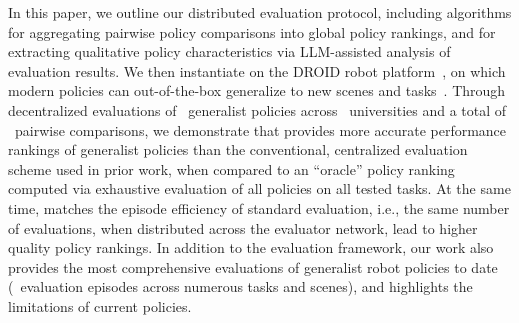 In this paper, we outline our distributed evaluation protocol, including algorithms for aggregating pairwise policy comparisons into global policy rankings, and for extracting qualitative policy characteristics via LLM-assisted analysis of evaluation results. We then instantiate \Acronym{} on the DROID robot platform~\citep{khazatsky2024droid}, on which modern policies can out-of-the-box generalize to new scenes and tasks~\citep{pertsch2025fast}. Through decentralized evaluations of \NPolicies{}~generalist policies across \NUniversities{}~universities and a total of \NPairwise{}~pairwise comparisons, we demonstrate that \Acronym{} provides more accurate performance rankings of generalist policies than the conventional, centralized evaluation scheme used in prior work, when compared to an ``oracle'' policy ranking computed via exhaustive evaluation of all policies on all tested tasks. At the same time, \Acronym{} matches the episode efficiency of standard evaluation, i.e., the same number of evaluations, when distributed across the \Acronym{} evaluator network, lead to higher quality policy rankings. In addition to the evaluation framework, our work also provides the most comprehensive evaluations of generalist robot policies to date (\NEvals{}~evaluation episodes across numerous tasks and scenes), and highlights the limitations of current policies. 







